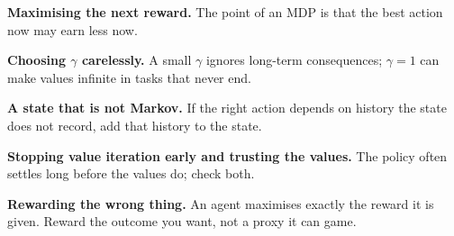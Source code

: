\begin{pitfall}
\begin{tight}
  \item \textbf{Maximising the next reward.} The point of an MDP is that the best
        action now may earn less now.
  \item \textbf{Choosing $\gamma$ carelessly.} A small $\gamma$ ignores long-term
        consequences; $\gamma = 1$ can make values infinite in tasks that never end.
  \item \textbf{A state that is not Markov.} If the right action depends on history
        the state does not record, add that history to the state.
  \item \textbf{Stopping value iteration early and trusting the values.} The policy
        often settles long before the values do; check both.
  \item \textbf{Rewarding the wrong thing.} An agent maximises exactly the reward it
        is given. Reward the outcome you want, not a proxy it can game.
\end{tight}
\end{pitfall}

